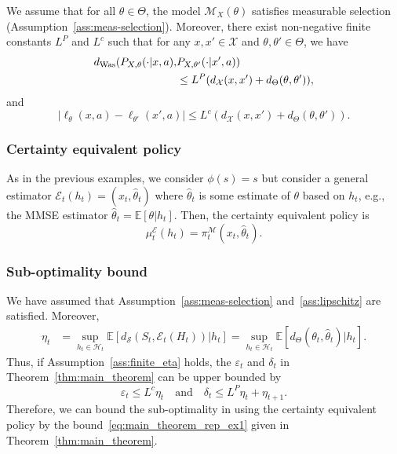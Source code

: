 \documentclass[letterpaper, 10pt]{IEEEtran}
\theoremstyle{plain}
\theoremstyle{nonumberplain}
\theoremstyle{plain}
\newcommand*\ALPHABET{\mathcal}
\newcommand*\ESTIMATE{\hat}
\newcommand*\EXP{\mathds{E}}
\newcommand\dWas{d_{\mathrm{Was}}}
\newcommand\dS{d_{\ALPHABET S}}
\newcommand\EST{\mathcal{E}}
\begin{document}
We assume that for all $\theta \in \Theta$, the model $\ALPHABET M_X(\theta)$ satisfies measurable selection (Assumption~\ref{ass:meas-selection}). Moreover,
there exist non-negative finite constants $L^P$ and $L^c$ such that for any $x, x' \in \ALPHABET X$ and $\theta, \theta' \in \Theta$, we have
\begin{align}\label{eq:Lip-P-learn}
    \dWas(P_{X, \theta}(\cdot | x, a),& P_{X, \theta'}(\cdot | x', a)) \notag \\
    &\le L^P (d_{\ALPHABET X}(x,x') + d_{\Theta}(\theta,\theta')),
\end{align}
and
\begin{equation}\label{eq:Lip-c-learn}
    \bigl| \ell_{\theta}(x,a) - \ell_{\theta'}(x',a) \bigr| \leq L^c (d_{{\ALPHABET X}}(x,x') + d_{\Theta}(\theta,\theta')).
\end{equation}

\subsubsection{Certainty equivalent policy}

As in the previous examples, we consider $\phi(s) = s$ but consider a general estimator $\EST_t(h_t) = (x_t, \hat \theta_t)$ where $\hat\theta_t$ is some estimate of $\theta$ based on $h_t$, e.g.,  the MMSE estimator $\ESTIMATE\theta_t = \EXP[\theta | h_t]$. Then, the certainty equivalent policy is
\[
    \mu^{\EST}_t(h_t) = \pi_t^{\ALPHABET M}(x_t, \hat\theta_t).
\]

\subsubsection{Sub-optimality bound}
We have assumed that Assumption~\ref{ass:meas-selection} and~\ref{ass:lipschitz} are satisfied. Moreover,
\begin{align}
\eta_t &= 
    \sup_{h_t \in \ALPHABET H_t} \EXP[ \dS(S_t, \EST_t(H_t)) | h_t ] 
    =\sup_{h_t \in \ALPHABET H_t} \EXP[ d_{\Theta}(\theta_t, \hat \theta_t) | h_t].
    \label{eq:eta_mdp_learning}
\end{align}
Thus, if Assumption~\ref{ass:finite_eta} holds, the $\varepsilon_t$ and $\delta_t$ in Theorem~\ref{thm:main_theorem} can be upper bounded by
\[
    \varepsilon_t \le  L^c \eta_t \quad\text{and}\quad \delta_t \le L^P \eta_t + \eta_{t+1}.
\]
Therefore, we can bound the sub-optimality in using the certainty equivalent policy by the bound~\eqref{eq:main_theorem_rep_ex1} given in Theorem~\ref{thm:main_theorem}. 
\end{document}

